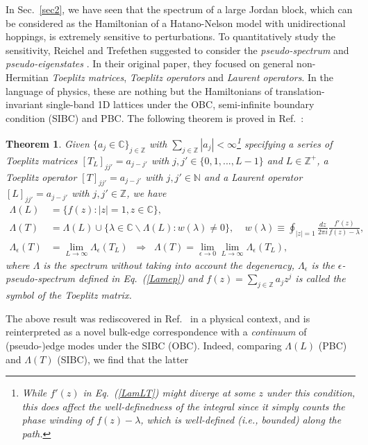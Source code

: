 \documentclass{tADP2e}
\theoremstyle{plain}
\theoremstyle{plain}
\newtheorem{theorem}{Theorem}[section]
\theoremstyle{definition}
\begin{document}
\vspace{3pt}
\noindent
In Sec.~\ref{sec2}, we have seen that the spectrum of a large Jordan block, which can be considered as the Hamiltonian of a Hatano-Nelson model with unidirectional hoppings, is extremely sensitive to perturbations. To quantitatively study the sensitivity, Reichel and Trefethen suggested to consider the \emph{pseudo-spectrum} and \emph{pseudo-eigenstates}  \cite{Reichel1992}. In their original paper, they focused on general non-Hermitian \emph{Toeplitz matrices}, \emph{Toeplitz operators} and \emph{Laurent operators}. In the language of physics, these are nothing but the Hamiltonians of translation-invariant single-band 1D lattices under the OBC, semi-infinite boundary condition (SIBC) and PBC.  The following theorem is proved in Ref.~\cite{Reichel1992}:
\begin{theorem}\label{Toeplitz}
Given $\{a_j\in\mathbb{C}\}_{j\in\mathbb{Z}}$ with $\sum_{j\in\mathbb{Z}}|a_j|<\infty$\footnote{While $f'(z)$ in Eq.~(\ref{LamLT}) might diverge at some $z$ under this condition, this does affect the well-definedness of the integral since it simply counts the phase winding of $f(z)-\lambda$, which is well-defined (i.e., bounded) along the path.} specifying a series of Toeplitz matrices $[T_L]_{jj'}=a_{j-j'}$ with $j,j'\in\{0,1,...,L-1\}$ and $L\in\mathbb{Z}^+$, a Toeplitz operator $[T]_{jj'}=a_{j-j'}$ with $j,j'\in\mathbb{N}$ and a Laurent operator $[L]_{jj'}=a_{j-j'}$ with $j,j'\in\mathbb{Z}$, we have
\begin{equation}
\begin{split}
\Lambda(L)&=\{f(z):|z|=1,z\in\mathbb{C}\},\\
\Lambda(T)&=\Lambda(L)\cup\{\lambda\in\mathbb{C}\backslash\Lambda(L):w(\lambda)\neq0\},\;\;\;\;w(\lambda)\equiv\oint_{|z|=1}\frac{dz}{2\pi i}\frac{f'(z)}{f(z)-\lambda}, \\
\Lambda_\epsilon(T)&=\lim_{L\to\infty}\Lambda_\epsilon(T_L)\;\;\Rightarrow\;\;\Lambda(T)=\lim_{\epsilon\to0}\lim_{L\to\infty}\Lambda_\epsilon(T_L),
\end{split}
\label{LamLT}
\end{equation}
where $\Lambda$ is the spectrum without taking into account the degeneracy, $\Lambda_\epsilon$ is the $\epsilon$-pseudo-spectrum defined in Eq.~(\ref{Lamep}) and $f(z)=\sum_{j\in\mathbb{Z}}a_jz^j$ is called the \emph{symbol} of the Toeplitz matrix.
\end{theorem}
The above result was rediscovered in Ref.~\cite{ZG18} in a physical context, and is reinterpreted as a novel bulk-edge correspondence with a \emph{continuum} of (pseudo-)edge modes under the SIBC (OBC). Indeed, comparing $\Lambda(L)$ (PBC) and $\Lambda(T)$ (SIBC), we find that the latter %
\end{document}
